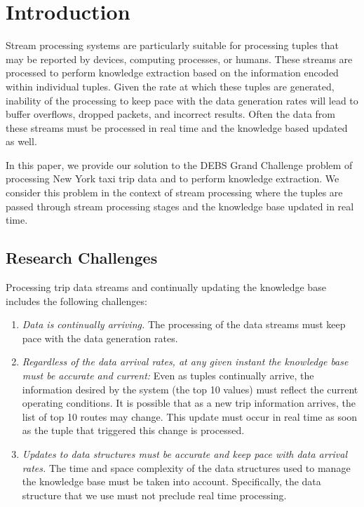 \section{Introduction}
Stream processing systems are particularly suitable for processing tuples that may be reported by devices, computing processes, or humans. These streams are processed to perform knowledge extraction based on the information encoded within individual tuples. Given the rate at which these tuples are generated, inability of the processing to keep pace with the data generation rates will lead to buffer overflows, dropped packets, and incorrect results. Often the data from these streams must be processed in real time and the knowledge based updated as well. 

In this paper, we provide our solution to the DEBS Grand Challenge problem of processing New York taxi trip data and to perform knowledge extraction. We consider this problem in the context of stream processing where the tuples are passed through stream processing stages and the knowledge base updated in real time.
\subsection{Research Challenges}
Processing trip data streams and continually updating the knowledge base includes the following challenges:
\begin{enumerate}
	\item \textit{Data is continually arriving.} The processing of the data streams must keep pace with the data generation rates.
	\item \textit{Regardless of the data arrival rates, at any given instant the knowledge base must be accurate and current:} Even as tuples continually arrive, the information desired by the system (the top 10 values) must reflect the current operating conditions. It is possible that as a new trip information arrives, the list of top 10 routes may change. This update must occur in real time as soon as the tuple that triggered this change is processed.
	\item \textit{Updates to data structures must be accurate and keep pace with data arrival rates.} The time and space complexity of the data structures used to manage the knowledge base must be taken into account. Specifically, the data structure that we use must not preclude real time processing.
\end{enumerate}

